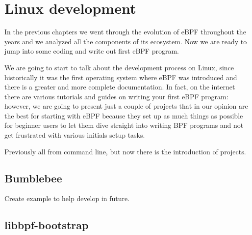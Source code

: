 \chapter{Linux development}

In the previous chapters we went through the evolution of eBPF throughout the years and we analyzed all the components of its ecosystem.
Now we are ready to jump into some coding and write out first eBPF program.

We are going to start to talk about the development process on Linux, since historically it was the first operating system where eBPF was introduced and there is a greater and more complete documentation.
In fact, on the internet there are various tutorials and guides on writing your first eBPF program: however, we are going to present just a couple of projects that in our opinion are the best for starting with eBPF because they set up as much things as possible for beginner users to let them dive straight into writing BPF programs and not get frustrated with various initials setup tasks.

Previously all from command line, but now there is the introduction of projects.

\section{Bumblebee}


Create example to help develop in future.

\section{libbpf-bootstrap}





